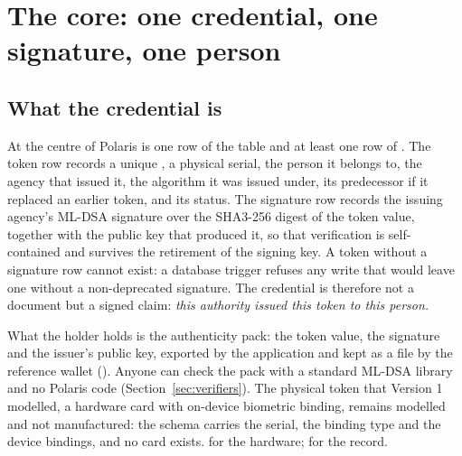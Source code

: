 \section{The core: one credential, one signature, one person}
\label{sec:core}

\subsection{What the credential is}

At the centre of Polaris is one row of the table  and at least one row of
. The token row records a unique , a physical serial, the
person it belongs to, the agency that issued it, the algorithm it was issued under, its predecessor if
it replaced an earlier token, and its status. The signature row records the issuing agency's ML-DSA
signature over the SHA3-256 digest of the token value, together with the public key that produced
it, so that verification is self-contained and survives the retirement of the signing key. A token
without a signature row cannot exist: a database trigger refuses any write that would leave one
without a non-deprecated signature. The credential is therefore not a document but a signed claim:
\emph{this authority issued this token to this person.} \sImpl

What the holder holds is the authenticity pack: the token value, the signature and the issuer's
public key, exported by the application and kept as a file by the reference wallet
(). Anyone can check the pack with a standard ML-DSA library and no
Polaris code (Section~\ref{sec:verifiers}). The physical token that Version 1 modelled, a hardware
card with on-device biometric binding, remains modelled and not manufactured: the schema carries the
serial, the binding type and the device bindings, and no card exists. \sFut{} for the hardware;
\sImpl{} for the record.



